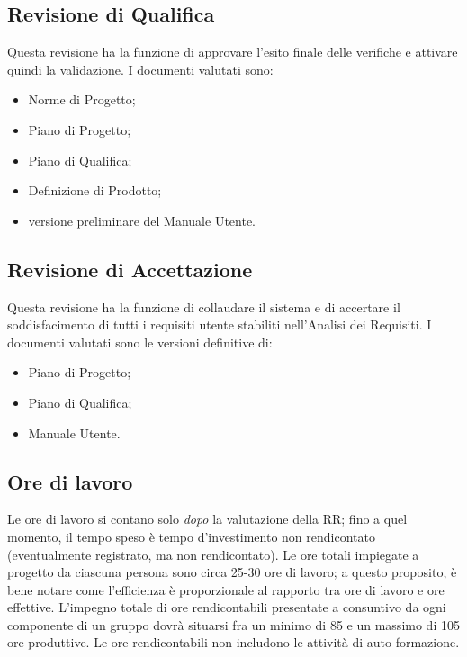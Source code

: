 \documentclass[a4paper]{article}
\begin{document}
		
	\subsection{Revisione di Qualifica}

		
Questa revisione ha la funzione di approvare l'esito finale delle verifiche e attivare quindi la validazione. I documenti valutati sono:
		
	\begin{itemize}
		
			
	\item Norme di Progetto;
			
	\item Piano di Progetto;
			
	\item Piano di Qualifica;
			
	\item Definizione di Prodotto;
			
	\item versione preliminare del Manuale Utente.
		
	\end{itemize}


		
	\subsection{Revisione di Accettazione}

		
Questa revisione ha la funzione di collaudare il sistema e di accertare il soddisfacimento di tutti i requisiti utente stabiliti nell'Analisi dei Requisiti. I documenti valutati sono le versioni definitive di:
		
	\begin{itemize}
		
			
	\item Piano di Progetto;
			
	\item Piano di Qualifica;
			
	\item Manuale Utente.
		
	\end{itemize}


		
	\subsection{Ore di lavoro}

		
Le ore di lavoro si contano solo \emph{dopo} la valutazione della RR; fino a quel momento, il tempo speso è tempo d'investimento non rendicontato (eventualmente registrato, ma non rendicontato). Le ore totali impiegate a progetto da ciascuna persona sono circa 25-30 ore di lavoro; a questo proposito, è bene notare come l'efficienza è proporzionale al rapporto tra ore di lavoro e ore effettive. L'impegno totale di ore rendicontabili presentate a consuntivo da ogni componente di un gruppo dovrà situarsi fra un minimo di 85 e un massimo di 105 ore produttive. Le ore rendicontabili non includono le attività di auto-formazione.
\end{document}
